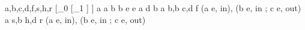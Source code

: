 a,b,c,d,f,s,h,r
[_{0} [_{1} ] ]
a a b b e e
a d b
a \rightarrow b,b \rightarrow c,d \rightarrow f
(a e, in), (b e, in ; c e, out)
a \rightarrow s,b \rightarrow h,d \rightarrow r
(a e, in), (b e, in ; c e, out)